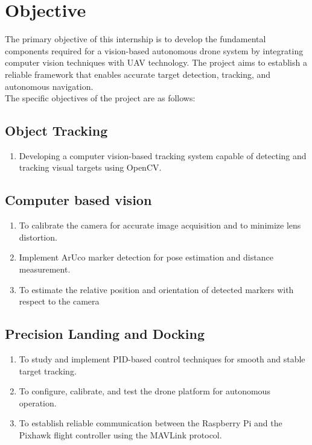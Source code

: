 \documentclass[12pt]{article}
\begin{document}
{\newpage
\section{Objective}
\thispagestyle{introstyle}
The primary objective of this internship is to develop the fundamental components required for a vision-based autonomous drone system by integrating computer vision techniques with UAV technology. The project aims to establish a reliable framework that enables accurate target detection, tracking, and autonomous navigation.\\
The specific objectives of the project are as follows:
\subsection{Object Tracking}
\begin{enumerate}[label=\roman*.]
\item{Developing a computer vision-based tracking system capable of detecting and tracking visual targets using OpenCV.}
\end{enumerate}
\subsection{Computer based vision}
\begin{enumerate}[label=\roman*.]
\item{To calibrate the camera for accurate image acquisition and to minimize lens distortion.}
\item{Implement ArUco marker detection for pose estimation and distance measurement.}
\item{To estimate the relative position and orientation of detected markers with respect to the camera}
\end{enumerate}
\subsection{Precision Landing and Docking}
\begin{enumerate}[label=\roman*.]
\item{To study and implement PID-based control techniques for smooth and stable target tracking.}
\item{To configure, calibrate, and test the drone platform for autonomous operation.}
\item{To establish reliable communication between the Raspberry Pi and the Pixhawk flight controller using the MAVLink protocol.}
\end{enumerate}
}
\end{document}
